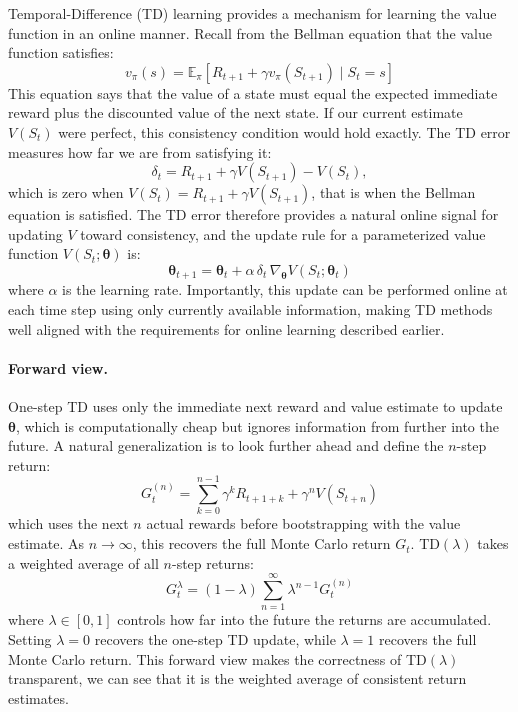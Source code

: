 Temporal-Difference (TD) learning provides a mechanism for learning the
value function in an online manner. Recall from the Bellman equation that
the value function satisfies:
\begin{equation}
    v_\pi(s) = \mathbb{E}_\pi \left[ R_{t+1} + \gamma v_\pi(S_{t+1}) \mid S_t = s \right]
\end{equation}
This equation says that the value of a state must equal the expected
immediate reward plus the discounted value of the next state. If our current
estimate $V(S_t)$ were perfect, this consistency condition would hold
exactly. The TD error measures how far we are from satisfying it:
\begin{equation}
\delta_t = R_{t+1} + \gamma V(S_{t+1}) - V(S_t),
\end{equation}
which is zero when $V(S_t) = R_{t+1} + \gamma V(S_{t+1})$, that is
when the Bellman equation is satisfied. The TD error therefore provides a
natural online signal for updating $V$ toward consistency, and the update
rule for a parameterized value function $V(S_t; \boldsymbol{\theta})$ is:
\begin{equation}
\boldsymbol{\theta}_{t+1} = \boldsymbol{\theta}_t + \alpha \, \delta_t \, \nabla_{\boldsymbol{\theta}}
V(S_t; \boldsymbol{\theta}_t)
\end{equation}
where $\alpha$ is the learning rate. Importantly, this update can be
performed online at each time step using only currently available
information, making TD methods well aligned with the requirements for online
learning described earlier.

\paragraph{Forward view.}
One-step TD uses only the immediate next reward and value estimate to update
$\boldsymbol{\theta}$, which is computationally cheap but ignores information from
further into the future. A natural generalization is to look further ahead
and define the $n$-step return:
\begin{equation}
    G_t^{(n)} = \sum_{k=0}^{n-1} \gamma^k R_{t+1+k} + \gamma^n V(S_{t+n})
\end{equation}
which uses the next $n$ actual rewards before bootstrapping with the value
estimate. As $n \to \infty$, this recovers the full Monte Carlo return $G_t$.
TD$(\lambda)$ takes a weighted average of all $n$-step returns:
\begin{equation}
\label{eq:advantage-sum}
    G_t^\lambda = (1-\lambda) \sum_{n=1}^{\infty} \lambda^{n-1} G_t^{(n)}
\end{equation}
where $\lambda \in [0,1]$ controls how far into the future the returns are
accumulated. Setting $\lambda = 0$ recovers the one-step TD update, while
$\lambda = 1$ recovers the full Monte Carlo return. This forward view makes
the correctness of TD$(\lambda)$ transparent, we can see that it is the weighted
average of consistent return estimates.

